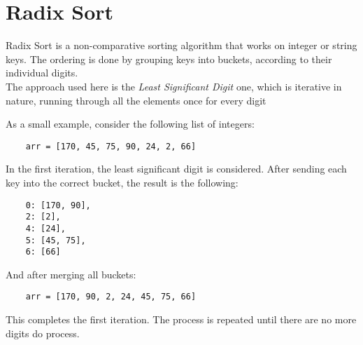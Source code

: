 \section{Radix Sort}
\label{sec:200}

Radix Sort is a non-comparative sorting algorithm that works on integer or string keys. The ordering is done by grouping keys into buckets, according to their individual digits.\\

The approach used here is the \emph{Least Significant Digit} one, which is iterative in nature, running through all the elements once for every digit


As a small example, consider the following list of integers:

\begin{lstlisting}
	arr = [170, 45, 75, 90, 24, 2, 66]
\end{lstlisting}

In the first iteration, the least significant digit is considered. After sending each key into the correct bucket, the result is the following:

\begin{lstlisting}
	0: [170, 90],
	2: [2],
	4: [24],
	5: [45, 75],
	6: [66]
\end{lstlisting}

And after merging all buckets:

\begin{lstlisting}
	arr = [170, 90, 2, 24, 45, 75, 66]
\end{lstlisting}

This completes the first iteration. The process is repeated until there are no more digits do process.